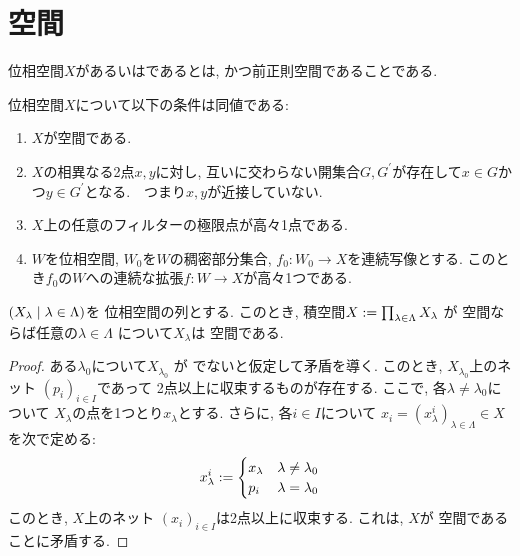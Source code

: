 \documentclass[uplatex, dvipdfmx, a4paper, 12pt, class=jsbook, crop=false]{standalone}
\begin{document}
\section{\Hausdorff 空間}
\label{sec:Hausdorff-spaces}

\begin{definition}
	位相空間$ X $があるいはであるとは, かつ前正則空間であることである.
\end{definition}

\begin{proposition}
	\label{T200001}
	位相空間$ X $について以下の条件は同値である:
	\begin{enumerate}
		\item $ X $が空間である.
		\item $ X $の相異なる2点$ x, y $に対し, 互いに交わらない開集合$ G, G^\prime $が存在して$ x \in G$かつ$ y \in G^\prime $となる.　つまり$ x, y $が近接していない.
		\item $ X $上の任意のフィルターの極限点が高々1点である.
		\item $ W $を位相空間, $ W_0 $を$ W $の稠密部分集合, $ f_0 \colon W_0 \rightarrow X $を連続写像とする. このとき$ f_0 $の$ W $への連続な拡張$ f \colon W \rightarrow X$が高々1つである.
	\end{enumerate}
\end{proposition}

\begin{proposition}
	\label{T200002}
	\( \setfamily{X_\lambda}{\lambda \in \Lambda} \)を
	位相空間の列とする.
	このとき, 積空間\( X \mathrel{:=} \prod_{\lambda \in \Lambda} X_\lambda \)
	が \Hausdorff 空間ならば任意の\( \lambda \in \Lambda \)
	について\( X_\lambda \)は \Hausdorff 空間である.
\end{proposition}

\begin{proof}
	ある\( \lambda_0 \)について\( X_{\lambda_0} \)
	が \Hausdorff でないと仮定して矛盾を導く.
	このとき, \( X_{\lambda_0} \)上のネット
	\( (p_i)_{i \in I} \)であって
	2点以上に収束するものが存在する.
	ここで, 各\( \lambda \neq \lambda_0 \)について
	\( X_\lambda \)の点を1つとり\( x_\lambda \)とする.
	さらに, 各\( i \in I \)について
	\( x_i = (x^i_\lambda)_{\lambda \in \Lambda} \in X \)
	を次で定める:
	\[ x^i_\lambda \mathrel{:=} \begin{cases}
		x_\lambda & \lambda \neq \lambda_0 \\
		p_i & \lambda =\lambda_0
	\end{cases} \]
	このとき, \( X \)上のネット
	\( (x_i)_{i \in I} \)は2点以上に収束する.
	これは, \( X \)が \Hausdorff 空間であることに矛盾する.
\end{proof}
\end{document}
